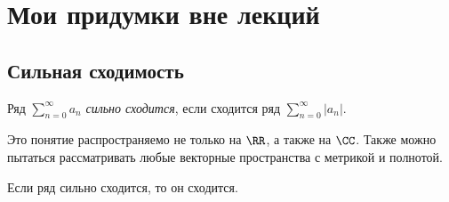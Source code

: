 \documentclass[12pt,a4paper]{article}
\begin{document}
    

    \newpage\null\thispagestyle{empty}\newpage
    \section{Мои придумки вне лекций}

    \subsection{Сильная сходимость}

    \begin{definition}
        Ряд $\sum_{n=0}^\infty a_n$ \emph{сильно сходится}, если сходится ряд $\sum_{n=0}^\infty |a_n|$.
    \end{definition}

    \begin{remark*}
        Это понятие распространяемо не только на $\RR$, а также на $\CC$. Также можно пытаться рассматривать любые векторные пространства с метрикой и полнотой.
    \end{remark*}

    \begin{lemma}
        Если ряд сильно сходится, то он сходится.
    \end{lemma}
\end{document}
